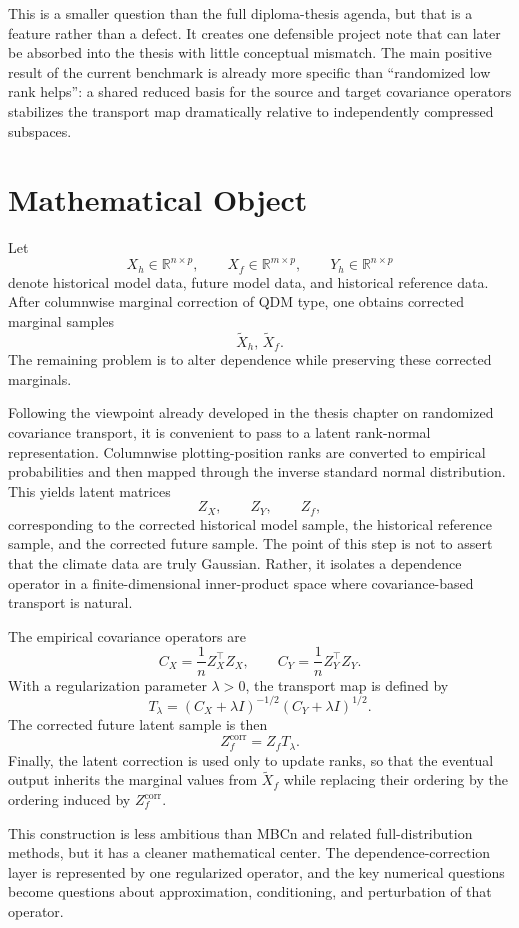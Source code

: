 This is a smaller question than the full diploma-thesis agenda, but that is a feature rather than a defect. It creates one defensible project note that can later be absorbed into the thesis with little conceptual mismatch. The main positive result of the current benchmark is already more specific than ``randomized low rank helps'': a shared reduced basis for the source and target covariance operators stabilizes the transport map dramatically relative to independently compressed subspaces.

\section{Mathematical Object}

Let
\[
	X_h \in \mathbb{R}^{n \times p}, \qquad X_f \in \mathbb{R}^{m \times p}, \qquad Y_h \in \mathbb{R}^{n \times p}
\]
denote historical model data, future model data, and historical reference data. After columnwise marginal correction of QDM type, one obtains corrected marginal samples
\[
	\widetilde X_h,\, \widetilde X_f.
\]
The remaining problem is to alter dependence while preserving these corrected marginals.

Following the viewpoint already developed in the thesis chapter on randomized covariance transport, it is convenient to pass to a latent rank-normal representation. Columnwise plotting-position ranks are converted to empirical probabilities and then mapped through the inverse standard normal distribution. This yields latent matrices
\[
	Z_X, \qquad Z_Y, \qquad Z_f,
\]
corresponding to the corrected historical model sample, the historical reference sample, and the corrected future sample. The point of this step is not to assert that the climate data are truly Gaussian. Rather, it isolates a dependence operator in a finite-dimensional inner-product space where covariance-based transport is natural.

The empirical covariance operators are
\[
	C_X = \frac{1}{n} Z_X^\top Z_X,
	\qquad
	C_Y = \frac{1}{n} Z_Y^\top Z_Y.
\]
With a regularization parameter $\lambda > 0$, the transport map is defined by
\[
	T_\lambda = (C_X + \lambda I)^{-1/2}(C_Y + \lambda I)^{1/2}.
\]
The corrected future latent sample is then
\[
	Z_f^{\mathrm{corr}} = Z_f T_\lambda.
\]
Finally, the latent correction is used only to update ranks, so that the eventual output inherits the marginal values from $\widetilde X_f$ while replacing their ordering by the ordering induced by $Z_f^{\mathrm{corr}}$.

This construction is less ambitious than MBCn and related full-distribution methods, but it has a cleaner mathematical center. The dependence-correction layer is represented by one regularized operator, and the key numerical questions become questions about approximation, conditioning, and perturbation of that operator.

